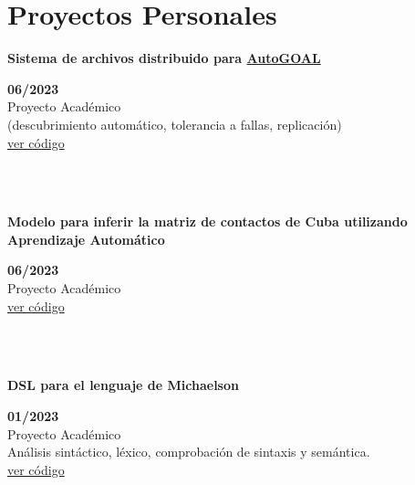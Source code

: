 \documentclass{article}
\begin{document}

\section*{Proyectos Personales}
\begin{minipage}{0.8\textwidth}
\parbox{0.8\linewidth}{\textbf{Sistema de archivos distribuido para \href{https://autogoal.github.io/}{AutoGOAL}}}\hfill \textbf{06/2023} \\
Proyecto Académico\\
(descubrimiento automático, tolerancia a fallas, replicación)\\
\href{https://github.com/geeksLabTech/kade-drive}{ver código}\\
\end{minipage} \hfill {}\\\\
\begin{minipage}{0.8\textwidth}
\parbox{0.8\linewidth}{\textbf{Modelo para inferir la matriz de contactos de Cuba utilizando Aprendizaje Automático}} \hfill \textbf{06/2023}\\
Proyecto Académico\\
\href{https://github.com/geeksLabTech/epidemic-classification-ml-project}{ver código}\\
\end{minipage} \hfill {}\\\\
\begin{minipage}{0.8\textwidth}
\parbox{0.8\linewidth}{\textbf{DSL para el lenguaje de Michaelson}} \hfill \textbf{01/2023}\\
Proyecto Académico\\
Análisis sintáctico, léxico, comprobación de sintaxis y semántica.\\
\href{https://github.com/geeksLabTech/compilation-dsl-project}{ver código}\\
\end{minipage} \hfill {}\\\\
\end{document}
